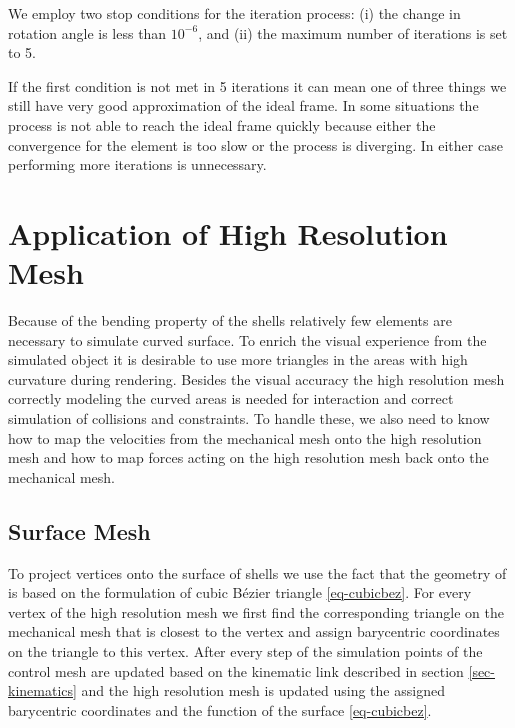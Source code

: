 \documentclass{egpubl}
\begin{document}
We employ two stop conditions for the iteration process:
(i) the change in rotation angle is less than $10^{-6}$, and
(ii) the maximum number of iterations is set to 5.

If the first condition is not met in 5 iterations it can mean one of three
things we still have very good approximation of the ideal frame. In some
situations the process is not able to reach the ideal frame quickly because
either the convergence for the element is too slow or the process is diverging.
In either case performing more iterations is unnecessary.




\section{Application of High Resolution Mesh} %

Because of the bending property of the shells relatively few elements are
necessary to simulate curved surface. To enrich the visual experience from
the simulated object it is desirable to use more triangles in the areas
with high curvature during rendering. 
Besides the visual accuracy the high resolution mesh correctly modeling the curved areas is needed for
interaction and correct simulation of collisions and constraints. 
To handle these, we also need to know how to map the velocities from the mechanical
mesh onto the high resolution mesh and how to map forces acting on the high
resolution mesh back onto the mechanical mesh.

\subsection{Surface Mesh}

To project vertices onto the surface of shells 
we use the fact that the geometry of is based on the formulation
of cubic B\'ezier triangle \eqref{eq-cubicbez}. For every vertex of the high
resolution mesh we first find the corresponding triangle on the mechanical
mesh that is closest to the vertex and assign barycentric coordinates on
the triangle to this vertex. After every step of the simulation points of the
control mesh are updated based on the kinematic link described in
section \ref{sec-kinematics} and the high
resolution mesh is updated using the assigned barycentric coordinates and
the function of the surface \eqref{eq-cubicbez}.
\end{document}
